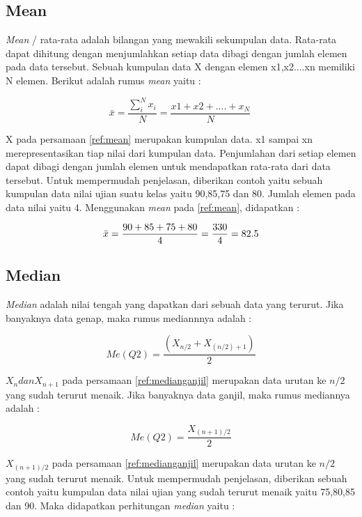 \subsection{Mean}
\textit{Mean} / rata-rata adalah bilangan yang mewakili sekumpulan data. Rata-rata dapat dihitung dengan menjumlahkan setiap data dibagi dengan jumlah elemen pada data tersebut. Sebuah kumpulan data X dengan elemen x1,x2....xn memiliki N elemen. Berikut adalah rumus \textit{mean} yaitu : 

\begin{equation}
\bar{x} = \frac{\sum_{i}^{N}x_i}{N} = \frac{x1+x2+....+x_N}{N} \
\label{ref:mean}
\end{equation}

X pada persamaan \ref{ref:mean} merupakan kumpulan data. x1 sampai xn merepresentasikan tiap nilai dari kumpulan data. Penjumlahan dari setiap elemen dapat dibagi dengan jumlah elemen untuk mendapatkan rata-rata dari data tersebut. Untuk mempermudah penjelasan, diberikan contoh yaitu sebuah kumpulan data nilai ujian suatu kelas yaitu 90,85,75 dan 80. Jumlah elemen pada data nilai yaitu 4. Menggunakan \textit{mean} pada \ref{ref:mean}, didapatkan : 

\begin{displaymath}
\bar{x} = \frac{90+85+75+80}{4} \\
= \frac{330}{4} = 82.5
\end{displaymath}


\subsection{Median}
\textit{Median} adalah nilai tengah yang dapatkan dari sebuah data yang terurut. Jika banyaknya data genap, maka rumus mediannnya adalah : 

\begin{equation}
Me(Q2) = \frac{(X_{n/2} + X_{(n/2)+1})}{2}
\label{ref:mediangenap}
\end{equation}
	
$X_n dan X_{n+1}$ pada persamaan \ref{ref:medianganjil} merupakan data urutan ke $n/2$ yang sudah terurut menaik. Jika banyaknya data ganjil, maka rumus mediannya adalah : 

\begin{equation}
Me(Q2) = \frac{X_{(n+1)/2}}{2}
\label{ref:medianganjil}
\end{equation}

 $X_{(n+1)/2}$ pada persamaan \ref{ref:medianganjil} merupakan data urutan ke $n/2$ yang sudah terurut menaik. Untuk mempermudah penjelasan, diberikan sebuah contoh yaitu kumpulan data nilai ujian yang sudah terurut menaik yaitu 75,80,85 dan 90. Maka didapatkan perhitungan \textit{median} yaitu :
 
